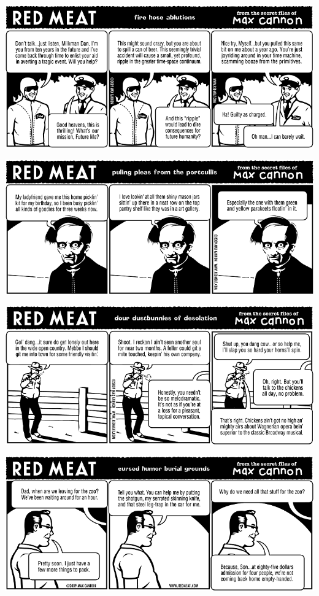 \documentclass[a4paper,twoside,11pt]{article}
\begin{document}
\includegraphics[width=\textwidth]{redmeat_2009-03-10.png}



\includegraphics[width=\textwidth]{redmeat_2009-03-17.png}



\includegraphics[width=\textwidth]{redmeat_2009-03-24.png}



\includegraphics[width=\textwidth]{redmeat_2009-03-31.png}
\end{document}
